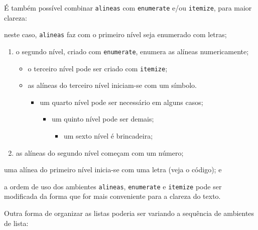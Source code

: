 É também possível combinar \texttt{alineas} com \texttt{enumerate} e/ou
\texttt{itemize}, para maior clareza:
  \begin{alineas}
    \item neste caso, \texttt{alineas} faz com o primeiro nível seja enumerado
    	com letras;
    	\begin{enumerate}
    		\item o segundo nível, criado com \texttt{enumerate}, enumera as 
    		alíneas numericamente;
    	\begin{itemize}
    			\item o terceiro nível pode ser criado com \texttt{itemize};
    			\item as alíneas do terceiro nível iniciam-se com um símbolo.
    			\begin{itemize}
    			\item um quarto nível pode ser necessário em alguns casos;
	    			\begin{itemize}
	    			\item um quinto nível pode ser demais;
		    			\begin{itemize}
		    			\item um sexto nível é brincadeira;
		    			\end{itemize} 
	    			\end{itemize} 
    			\end{itemize} 
    		\end{itemize}
    		\item as alíneas do segundo nível começam com um número;
    	\end{enumerate}
    \item uma alínea do primeiro nível inicia-se com uma letra (veja o código); e
    \item a ordem de uso dos ambientes \texttt{alineas}, \texttt{enumerate} e
    \texttt{itemize} pode ser modificada da forma que for mais conveniente para
    a clareza do texto.
  \end{alineas}
Outra forma de organizar as listas poderia ser variando a sequência de ambientes
de lista:
